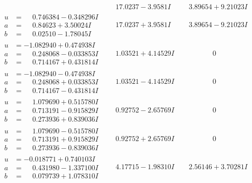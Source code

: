 \documentclass[1p]{elsarticle_modified}
\theoremstyle{definition}
\begin{document}
$$\begin{array}{c|c|c}
 & \phantom{-}17.0237 - 3.9581 I & \phantom{-}3.89654 + 9.21023 I \\ \hline\begin{aligned}
u &= \phantom{-}0.746384 - 0.348296 I \\
a &= \phantom{-}0.84623 + 3.50024 I \\
b &= \phantom{-}0.02510 - 1.78045 I\end{aligned}
 & \phantom{-}17.0237 + 3.9581 I & \phantom{-}3.89654 - 9.21023 I \\ \hline\begin{aligned}
u &= -1.082940 + 0.474938 I \\
a &= \phantom{-}0.248068 - 0.033853 I \\
b &= \phantom{-}0.714167 + 0.431814 I\end{aligned}
 & \phantom{-}1.03521 + 4.14529 I & \phantom{-0.000000 } 0 \\ \hline\begin{aligned}
u &= -1.082940 - 0.474938 I \\
a &= \phantom{-}0.248068 + 0.033853 I \\
b &= \phantom{-}0.714167 - 0.431814 I\end{aligned}
 & \phantom{-}1.03521 - 4.14529 I & \phantom{-0.000000 } 0 \\ \hline\begin{aligned}
u &= \phantom{-}1.079690 + 0.515780 I \\
a &= \phantom{-}0.713191 - 0.915829 I \\
b &= \phantom{-}0.273936 + 0.839036 I\end{aligned}
 & \phantom{-}0.92752 - 2.65769 I & \phantom{-0.000000 } 0 \\ \hline\begin{aligned}
u &= \phantom{-}1.079690 - 0.515780 I \\
a &= \phantom{-}0.713191 + 0.915829 I \\
b &= \phantom{-}0.273936 - 0.839036 I\end{aligned}
 & \phantom{-}0.92752 + 2.65769 I & \phantom{-0.000000 } 0 \\ \hline\begin{aligned}
u &= -0.018771 + 0.740103 I \\
a &= \phantom{-}0.431980 - 1.337100 I \\
b &= \phantom{-}0.079739 + 1.078310 I\end{aligned}
 & \phantom{-}4.17715 - 1.98310 I & \phantom{-}2.56146 + 3.70281 I \\ \hline\begin{aligned}

\end{aligned}
\end{array}$$
\end{document}

